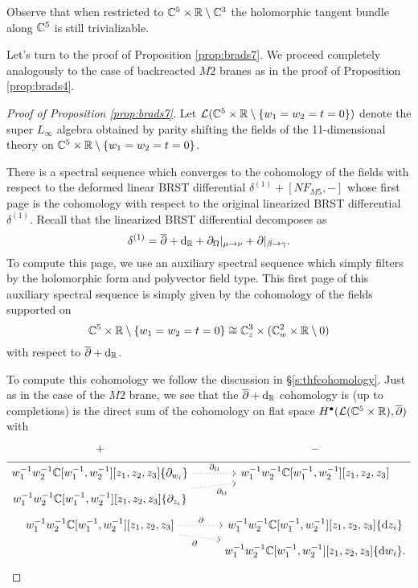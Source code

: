 Observe that when restricted to $\mathbb C^5 \times \mathbb R \setminus \mathbb C^3$ the holomorphic tangent bundle along $\mathbb C^5$ is still trivializable. 

\parsec[]

Let's turn to the proof of Proposition \ref{prop:brads7}.
We proceed completely analogously to the case of backreacted $M2$ branes as in the proof of Proposition \ref{prop:brads4}. 

\begin{proof}[Proof of Proposition \ref{prop:brads7}]
Let $\mathcal L (\mathbb C^5 \times \mathbb R \setminus \{w_1=w_2=t=0\})$ denote the super $L_\infty$ algebra obtained by parity shifting the fields of the 11-dimensional theory on $\mathbb C^5 \times \mathbb R \setminus \{w_1=w_2=t=0\}$. 

There is a spectral sequence which converges to the cohomology of the fields with respect to the deformed linear BRST differential $\delta^{(1)} + [N F_{M5},-]$ whose first page
is the cohomology with respect to the original linearized BRST differential $\delta^{(1)}$. 
Recall that the linearized BRST differential decomposes as
\[
\delta^{(1)} = \overline{\partial} + {\rm d}_{\mathbb R} + \partial_{\Omega} |_{\mu \to \nu} + \partial |_{\beta \to \gamma}  .
\]
To compute this page, we use an auxiliary spectral sequence which simply filters by the holomorphic form and polyvector field type. 
This first page of this auxiliary spectral sequence is simply given by the cohomology of the fields supported on 
\[
\mathbb C^5 \times \mathbb R \setminus \{w_1=w_2=t=0\} \cong \mathbb C_z^3 \times (\mathbb C^2_w \times \mathbb R \setminus 0)
\]
with respect to $\overline{\partial} + {\rm d}_{\mathbb R}$. 

To compute this cohomology we follow the discussion in \S \ref{s:thfcohomology}.
Just as in the case of the $M2$ brane, we see that the $\overline{\partial} + {\rm d}_{\mathbb R}$ cohomology is (up to completions) is the direct sum of the cohomology on flat space $H^\bullet(\mathcal L(\mathbb C^5 \times \mathbb R), \overline{\partial})$ with
\begin{equation}
  \label{eqn:ads7ss2} 
  \begin{tikzcd}[row sep = 1 ex]
    + & - \\ \hline
w_1^{-1} w_2^{-1} \CC[w_1^{-1}, w_2^{-1}][z_1,z_2,z_3] \{\partial_{w_i}\}  \ar[r, dotted, "\div"] & w_1^{-1} w_2^{-1} \CC[w_1^{-1}, w_2^{-1}] [z_1,z_2,z_3] \\
w_1^{-1} w_2^{-1} \CC[w_1^{-1}, w_2^{-1}] [z_1,z_2,z_3] \{\del_{z_i}\} \ar[ur, dotted, "\div"'] \\
w_1^{-1} w_2^{-1} \CC[w_1^{-1}, w_2^{-1}] [z_1,z_2,z_3] \ar[r, dotted, "\del"] \ar[dr, dotted, "\del"'] & w_1^{-1} w_2^{-1} \CC[w_1^{-1}, w_2^{-1}][z_1,z_2,z_3] \{\d z_i\} \\ & w_1^{-1} w_2^{-1} \CC[w_1^{-1}, w_2^{-1}][z_1,z_2,z_3] \{\d w_i\} .
\end{tikzcd}
\end{equation}


\end{proof}
